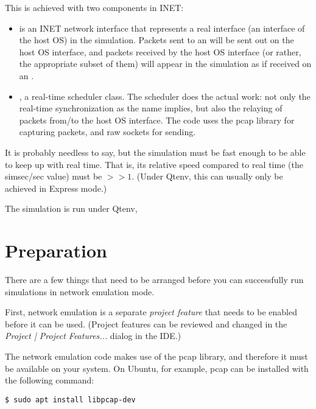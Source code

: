 This is achieved with two components in INET:

\begin{itemize}
  \item {} is an INET network interface that represents
    a real interface (an interface of the host OS) in the simulation.
    Packets sent to an  will be sent out on the
    host OS interface, and packets received by the host OS interface
    (or rather, the appropriate subset of them) will appear in the
    simulation as if received on an .
 \item {}, a real-time scheduler class.
    The scheduler does the actual work: not only the real-time
    synchronization as the name implies, but also the relaying of packets
    from/to the host OS interface. The code uses the pcap library for
    capturing packets, and raw sockets for sending.
\end{itemize}

\begin{note}
It is probably needless to say, but the simulation must be fast enough
to be able to keep up with real time. That is, its relative speed compared
to real time (the simsec/sec value) must be $>>1$.  (Under Qtenv, this
can usually only be achieved in Express mode.)
\end{note}

The simulation is run under Qtenv,

\section{Preparation}
\label{sec:emulation:preparation}

There are a few things that need to be arranged before you can successfully
run simulations in network emulation mode.

First, network emulation is a separate \textit{project feature} that needs to
be enabled before it can be used. (Project features can be reviewed and changed
in the \emph{Project | Project Features...} dialog in the IDE.)

The network emulation code makes use of the pcap library, and therefore
it must be available on your system. On Ubuntu, for example, pcap can be
installed with the following command:

\begin{verbatim}
$ sudo apt install libpcap-dev
\end{verbatim}

